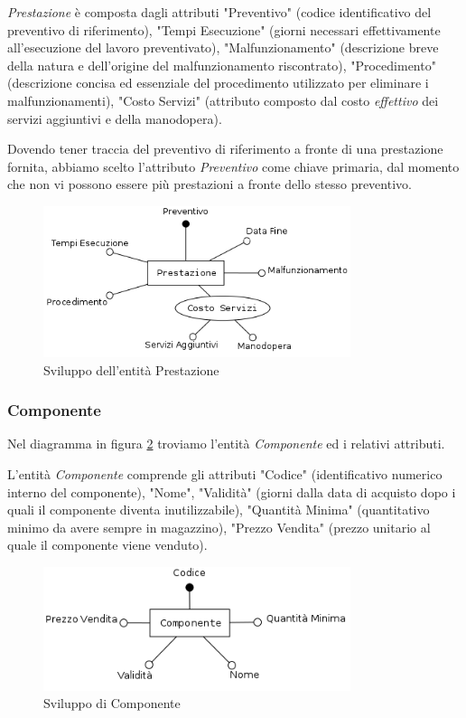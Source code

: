 			\emph{Prestazione} è composta dagli attributi "Preventivo" (codice identificativo del preventivo di riferimento), "Tempi Esecuzione" (giorni necessari effettivamente all'esecuzione del lavoro preventivato), "Malfunzionamento" (descrizione breve della natura e dell'origine del malfunzionamento riscontrato), "Procedimento" (descrizione concisa ed essenziale del procedimento utilizzato per eliminare i malfunzionamenti), "Costo Servizi" (attributo composto dal costo \emph{effettivo} dei servizi aggiuntivi e della manodopera).
		
			Dovendo tener traccia del preventivo di riferimento a fronte di una prestazione fornita, abbiamo scelto l'attributo \emph{Preventivo} come chiave primaria, dal momento che non vi possono essere più prestazioni a fronte dello stesso preventivo.
		
			\begin{figure}[H]
				\centering
				\includegraphics[width=9cm]{images/finitures/prestazione.png}
				\caption{Sviluppo dell'entità Prestazione}
				\label{fig:prestazione}
			\end{figure}
		
		\subsubsection{Componente}
			
			Nel diagramma in figura \ref{fig:componente} troviamo l'entità \emph{Componente} ed i relativi attributi.
			
			L'entità \emph{Componente} comprende gli attributi "Codice" (identificativo numerico interno del componente), "Nome", "Validità" (giorni dalla data di acquisto dopo i quali il componente diventa inutilizzabile), "Quantità Minima" (quantitativo minimo da avere sempre in magazzino), "Prezzo Vendita" (prezzo unitario al quale il componente viene venduto). 
			
			\begin{figure}[H]
				\centering
				\includegraphics[width=9cm]{images/finitures/componente.png}
				\caption{Sviluppo di Componente}
				\label{fig:componente}
			\end{figure}
		
